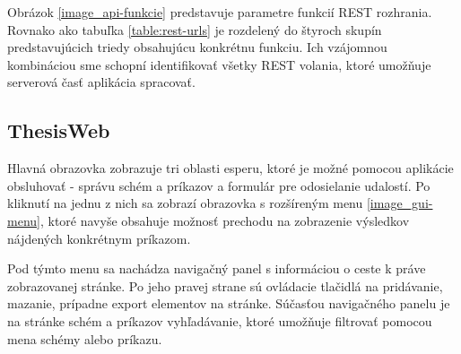 	Obrázok \ref{image_api-funkcie} predstavuje parametre funkcií REST rozhrania. Rovnako ako tabuľka \ref{table:rest-urls} je rozdelený do štyroch skupín predstavujúcich triedy obsahujúcu konkrétnu funkciu. Ich vzájomnou kombináciou sme schopní identifikovať všetky REST volania, ktoré umožňuje serverová časť aplikácia spracovať.



	\subsection{ThesisWeb}
	Hlavná obrazovka zobrazuje tri oblasti esperu, ktoré je možné pomocou aplikácie obsluhovať - správu schém a príkazov a formulár pre odosielanie udalostí. Po kliknutí na jednu z nich sa zobrazí obrazovka s rozšíreným menu \ref{image_gui-menu}, ktoré navyše obsahuje možnosť prechodu na zobrazenie výsledkov nájdených konkrétnym príkazom.
	
	Pod týmto menu sa nachádza navigačný panel s informáciou o ceste k práve zobrazovanej stránke. Po jeho pravej strane sú ovládacie tlačidlá na pridávanie, mazanie, prípadne export elementov na stránke. Súčasťou navigačného panelu je na stránke schém a príkazov vyhľadávanie, ktoré umožňuje filtrovať pomocou mena schémy alebo príkazu.
	
